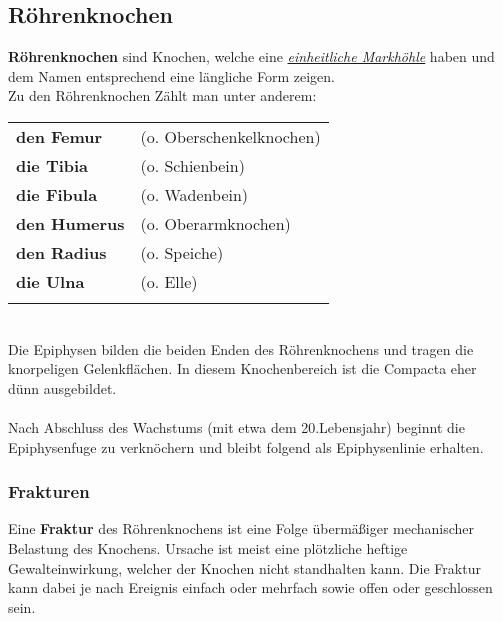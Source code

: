 \documentclass{article}
\begin{document}
\subsection{Röhrenknochen}
\textbf{Röhrenknochen} sind Knochen, welche eine \underline{\textit{einheitliche Markhöhle}} haben und dem Namen entsprechend eine längliche Form zeigen. \\
Zu den Röhrenknochen Zählt man unter anderem:
\begin{tabular}{@{}l l@{}}\\
    \hline
    \textbf{den Femur}   & (o. Oberschenkelknochen) \\
    \textbf{die Tibia}   & (o. Schienbein) \\
    \textbf{die Fibula}  & (o. Wadenbein) \\
    \textbf{den Humerus} & (o. Oberarmknochen) \\
    \textbf{den Radius}  & (o. Speiche) \\
    \textbf{die Ulna}    & (o. Elle) \\
    \hline \\
\end{tabular}
\\
Die Epiphysen bilden die beiden Enden des Röhrenknochens und tragen die knorpeligen Gelenkflächen. In diesem Knochenbereich ist die Compacta eher dünn ausgebildet. \\ \\ 
Nach Abschluss des Wachstums (mit etwa dem 20.Lebensjahr) beginnt die Epiphysenfuge zu verknöchern und bleibt folgend als Epiphysenlinie erhalten.
\subsubsection{Frakturen}
Eine \textbf{Fraktur} des Röhrenknochens ist eine Folge übermäßiger mechanischer Belastung des Knochens.
Ursache ist meist eine plötzliche heftige Gewalteinwirkung, welcher der Knochen nicht standhalten kann. 
Die Fraktur kann dabei je nach Ereignis einfach oder mehrfach sowie offen oder geschlossen sein.
\newpage
\setlength{\bibhang}{2em} %
\setlength{\bibitemsep}{1em} %
\nocite{*}
\printbibliography[title={Literaturverzeichnis}]
\end{document}

